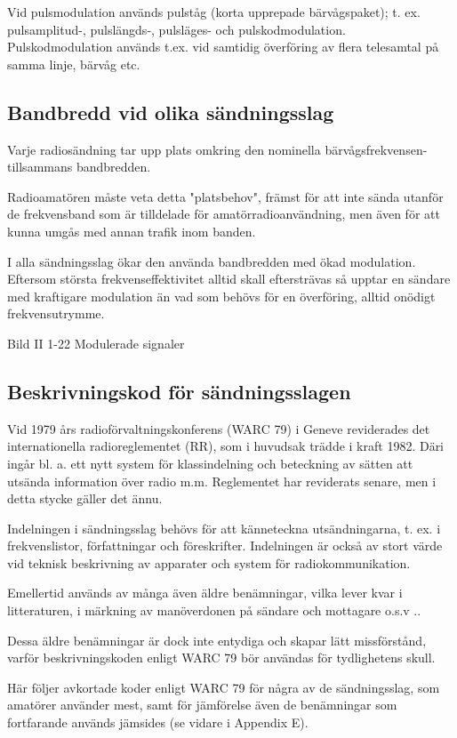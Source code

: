 \documentclass[a4paper,twoside,twocolumn,openright]{book}
\begin{document}
Vid pulsmodulation används pulståg (korta upprepade bärvågspaket); t. ex. pulsamplitud-,
pulslängds-, pulsläges- och pulskodmodulation. Pulskodmodulation används t.ex. vid
samtidig överföring av flera telesamtal på samma linje, bärvåg etc.

\subsection{Bandbredd vid olika sändningsslag}

Varje radiosändning tar upp plats omkring den nominella bärvågsfrekvensen- tillsammans
bandbredden.

Radioamatören måste veta detta "platsbehov", främst för att inte sända utanför de
frekvensband som är tilldelade för amatörradioanvändning, men även för att kunna
umgås med annan trafik inom banden.

I alla sändningsslag ökar den använda bandbredden med ökad modulation. Eftersom största
frekvenseffektivitet alltid skall eftersträvas så upptar en sändare med kraftigare
modulation än vad som behövs för en överföring, alltid onödigt frekvensutrymme.

Bild II 1-22 Modulerade signaler

\subsection{Beskrivningskod för sändningsslagen}

Vid 1979 års radioförvaltningskonferens (WARC 79) i Geneve reviderades det internationella
radioreglementet (RR), som i huvudsak trädde i kraft 1982. Däri ingår bl. a. ett nytt
system för klassindelning och beteckning av sätten att utsända information över
radio m.m. Reglementet har reviderats senare, men i detta stycke gäller det ännu.

Indelningen i sändningsslag behövs för att känneteckna utsändningarna, t. ex. i
frekvenslistor, författningar och föreskrifter. Indelningen är också av stort värde vid
teknisk beskrivning av apparater och system för radiokommunikation.

Emellertid används av många även äldre benämningar, vilka lever kvar i litteraturen, i
märkning av manöverdonen på sändare och mottagare o.s.v ..

Dessa äldre benämningar är dock inte entydiga och skapar lätt missförstånd, varför
beskrivningskoden enligt WARC 79 bör användas för tydlighetens skull.

Här följer avkortade koder enligt WARC 79 för några av de sändningsslag, som amatörer
använder mest, samt för jämförelse även de benämningar som fortfarande används jämsides
(se vidare i Appendix E).
\end{document}
